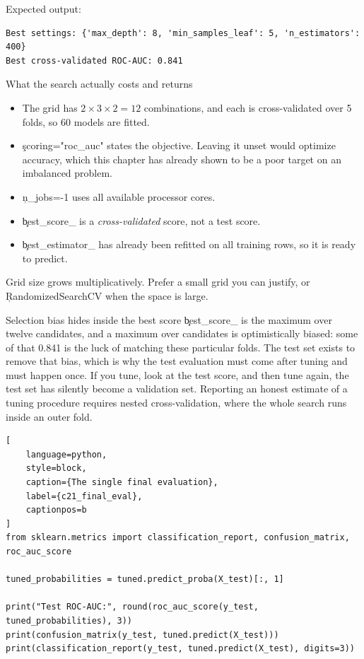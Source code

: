 Expected output:

\begin{lstlisting}[language=text, style=block, caption={Twelve combinations, five folds, one winner}, label={c21_gridsearch_output}, captionpos=b]
Best settings: {'max_depth': 8, 'min_samples_leaf': 5, 'n_estimators': 400}
Best cross-validated ROC-AUC: 0.841
\end{lstlisting}

\begin{SyntaxBox}{What the search actually costs and returns}
\begin{itemize}
    \item The grid has $2 \times 3 \times 2 = 12$ combinations, and each is
          cross-validated over 5 folds, so 60 models are fitted.
    \item \c{scoring="roc_auc"} states the objective. Leaving it unset would
          optimize accuracy, which this chapter has already shown to be a poor
          target on an imbalanced problem.
    \item \c{n_jobs=-1} uses all available processor cores.
    \item \c{best_score_} is a \emph{cross-validated} score, not a test score.
    \item \c{best_estimator_} has already been refitted on all training rows, so
          it is ready to predict.
\end{itemize}
Grid size grows multiplicatively. Prefer a small grid you can justify, or
\c{RandomizedSearchCV} when the space is large.
\end{SyntaxBox}

\begin{ExplainBox}{Selection bias hides inside the best score}
\c{best_score_} is the maximum over twelve candidates, and a maximum over
candidates is optimistically biased: some of that 0.841 is the luck of matching
these particular folds. The test set exists to remove that bias, which is why the
test evaluation must come after tuning and must happen once. If you tune, look at
the test score, and then tune again, the test set has silently become a
validation set. Reporting an honest estimate of a tuning procedure requires
nested cross-validation, where the whole search runs inside an outer fold.
\end{ExplainBox}


\begin{lstlisting}[
    language=python,
    style=block,
    caption={The single final evaluation},
    label={c21_final_eval},
    captionpos=b
]
from sklearn.metrics import classification_report, confusion_matrix, roc_auc_score

tuned_probabilities = tuned.predict_proba(X_test)[:, 1]

print("Test ROC-AUC:", round(roc_auc_score(y_test, tuned_probabilities), 3))
print(confusion_matrix(y_test, tuned.predict(X_test)))
print(classification_report(y_test, tuned.predict(X_test), digits=3))
\end{lstlisting}

